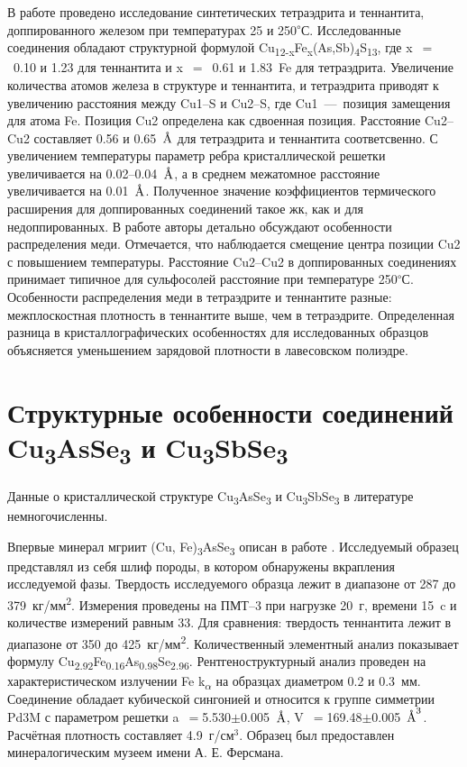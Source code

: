 В работе \cite{Friese2008} проведено исследование синтетических тетраэдрита и теннантита, доппированного железом при температурах 25 и 250\textsuperscript{$\circ$}С. Исследованные соединения обладают структурной формулой Cu\textsubscript{12-x}Fe\textsubscript{x}(As,Sb)\textsubscript{4}S\textsubscript{13}, где  x~$=$~0.10 и 1.23 для теннантита  и  x~$=$~0.61 и 1.83~Fe для тетраэдрита.
 Увеличение количества атомов железа в структуре и теннантита, и тетраэдрита приводят к увеличению расстояния между Cu1--S и Cu2--S, где Cu1~---~позиция замещения для атома Fe. Позиция Cu2 определена как сдвоенная позиция. Расстояние Cu2--Cu2 составляет 0.56 и 0.65~$\mbox{\normalfont\AA}$ для тетраэдрита и теннантита соответсвенно. С увеличением температуры параметр ребра кристаллической решетки увеличивается на 0.02--0.04~$\mbox{\normalfont\AA}$, а в среднем межатомное расстояние увеличивается на 0.01~$\mbox{\normalfont\AA}$. Полученное значение коэффициентов термического расширения для доппированных соединений такое жк, как и для недоппированных.
 В работе авторы детально обсуждают особенности распределения меди. Отмечается, что наблюдается смещение центра позиции Cu2 с повышением температуры. Расстояние Cu2--Cu2 в доппированных соединениях принимает типичное для сульфосолей расстояние при температуре 250\textsuperscript{$\circ$}С. Особенности распределения меди в тетраэдрите и теннантите разные:
межплоскостная плотность в теннантите выше, чем в тетраэдрите. Определенная разница в кристаллографических особенностях для исследованных образцов объясняется уменьшением зарядовой плотности в лавесовском полиэдре.
\newpage

\section{Структурные особенности соединений Cu\textsubscript{3}AsSe\textsubscript{3} и Cu\textsubscript{3}SbSe\textsubscript{3}} \label{sect1_2}

Данные о кристаллической структуре Cu\textsubscript{3}AsSe\textsubscript{3} и Cu\textsubscript{3}SbSe\textsubscript{3} в литературе немногочисленны.

Впервые минерал мгриит (Cu, Fe)\textsubscript{3}AsSe\textsubscript{3} описан в работе \cite{Dymlcov_1983}. Исследуемый образец представлял из себя шлиф породы, в котором обнаружены вкрапления исследуемой фазы. Твердость исследуемого образца лежит в диапазоне от 287 до 379~кг/мм\textsuperscript{2}. Измерения проведены на ПМТ--3 при нагрузке 20~г, времени 15~c и количестве измерений равным 33. Для сравнения: твердость теннантита лежит в диапазоне от 350 до 425~кг/мм\textsuperscript{2}. Количественный элементный анализ показывает формулу Cu\textsubscript{2.92}Fe\textsubscript{0.16}As\textsubscript{0.98}Se\textsubscript{2.96}. Рентгеноструктурный анализ проведен на характеристическом излучении Fe k\textsubscript{$\alpha$} на образцах диаметром 0.2 и 0.3~мм. Соединение обладает кубической сингонией и относится к группе симметрии Pd3M с параметром решетки a~$=$5.530$\pm$0.005~$\mbox{\normalfont\AA}$, V~$=$169.48$\pm$0.005~$\mbox{\normalfont\AA}^{3}$. Расчётная плотность составляет 4.9~г/см$^{3}$. Образец был предоставлен минералогическим музеем имени А. Е. Ферсмана.

